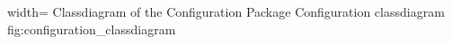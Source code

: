  {width=\textwidth}%
 {Classdiagram of the Configuration Package}%
 {Configuration classdiagram}%
 {fig:configuration_classdiagram}%


